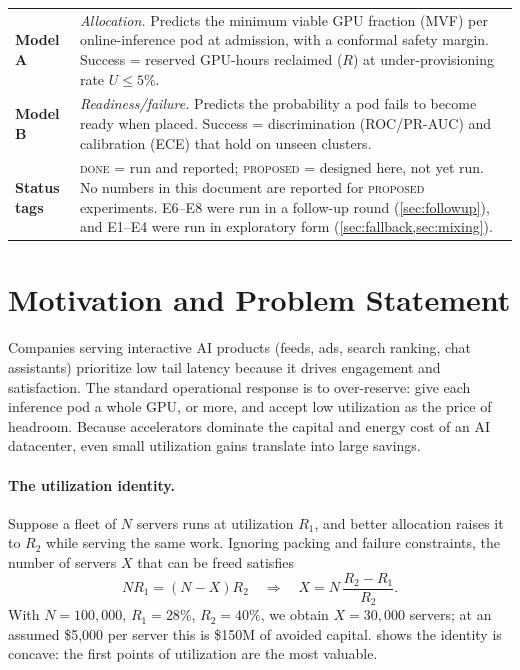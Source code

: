 \documentclass[11pt]{article}
\newcommand{\status}[1]{\textsc{#1}}
\begin{document}
\begin{keybox}
\small
\begin{tabularx}{\linewidth}{@{}lL@{}}
\textbf{Model A} & \emph{Allocation.} Predicts the minimum viable GPU fraction (MVF) per online-inference pod at admission, with a conformal safety margin. Success = reserved GPU-hours reclaimed ($R$) at under-provisioning rate $U \le 5\%$. \\
\textbf{Model B} & \emph{Readiness/failure.} Predicts the probability a pod fails to become ready when placed. Success = discrimination (ROC/PR-AUC) and calibration (ECE) that hold on unseen clusters. \\
\textbf{Status tags} & \status{done} = run and reported; \status{proposed} = designed here, not yet run. No numbers in this document are reported for \status{proposed} experiments. E6--E8 were run in a follow-up round (\cref{sec:followup}), and E1--E4 were run in exploratory form (\cref{sec:fallback,sec:mixing}). \\
\end{tabularx}
\end{keybox}

\tableofcontents
\newpage

\section{Motivation and Problem Statement}
\label{sec:motivation}

Companies serving interactive AI products (feeds, ads, search ranking, chat assistants) prioritize low tail latency because it drives engagement and satisfaction. The standard operational response is to over-reserve: give each inference pod a whole GPU, or more, and accept low utilization as the price of headroom. Because accelerators dominate the capital and energy cost of an AI datacenter, even small utilization gains translate into large savings.

\paragraph{The utilization identity.} Suppose a fleet of $N$ servers runs at utilization $R_1$, and better allocation raises it to $R_2$ while serving the same work. Ignoring packing and failure constraints, the number of servers $X$ that can be freed satisfies
\begin{equation}
N R_1 = (N - X) R_2 \quad\Longrightarrow\quad X = N\,\frac{R_2 - R_1}{R_2}.
\label{eq:util}
\end{equation}
With $N = 100{,}000$, $R_1 = 28\%$, $R_2 = 40\%$, we obtain $X = 30{,}000$ servers; at an assumed \$5{,}000 per server this is \$150M of avoided capital.  shows the identity is concave: the first points of utilization are the most valuable.
\end{document}
